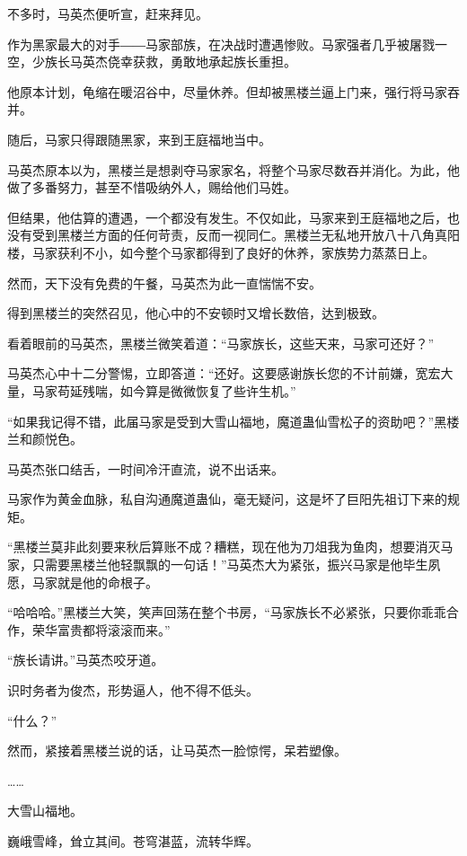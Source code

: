 
\begin{this_body}

不多时，马英杰便听宣，赶来拜见。

作为黑家最大的对手――马家部族，在决战时遭遇惨败。马家强者几乎被屠戮一空，少族长马英杰侥幸获救，勇敢地承起族长重担。

他原本计划，龟缩在暖沼谷中，尽量休养。但却被黑楼兰逼上门来，强行将马家吞并。

随后，马家只得跟随黑家，来到王庭福地当中。

马英杰原本以为，黑楼兰是想剥夺马家家名，将整个马家尽数吞并消化。为此，他做了多番努力，甚至不惜吸纳外人，赐给他们马姓。

但结果，他估算的遭遇，一个都没有发生。不仅如此，马家来到王庭福地之后，也没有受到黑楼兰方面的任何苛责，反而一视同仁。黑楼兰无私地开放八十八角真阳楼，马家获利不小，如今整个马家都得到了良好的休养，家族势力蒸蒸日上。

然而，天下没有免费的午餐，马英杰为此一直惴惴不安。

得到黑楼兰的突然召见，他心中的不安顿时又增长数倍，达到极致。

看着眼前的马英杰，黑楼兰微笑着道：“马家族长，这些天来，马家可还好？”

马英杰心中十二分警惕，立即答道：“还好。这要感谢族长您的不计前嫌，宽宏大量，马家苟延残喘，如今算是微微恢复了些许生机。”

“如果我记得不错，此届马家是受到大雪山福地，魔道蛊仙雪松子的资助吧？”黑楼兰和颜悦色。

马英杰张口结舌，一时间冷汗直流，说不出话来。

马家作为黄金血脉，私自沟通魔道蛊仙，毫无疑问，这是坏了巨阳先祖订下来的规矩。

“黑楼兰莫非此刻要来秋后算账不成？糟糕，现在他为刀俎我为鱼肉，想要消灭马家，只需要黑楼兰他轻飘飘的一句话！”马英杰大为紧张，振兴马家是他毕生夙愿，马家就是他的命根子。

“哈哈哈。”黑楼兰大笑，笑声回荡在整个书房，“马家族长不必紧张，只要你乖乖合作，荣华富贵都将滚滚而来。”

“族长请讲。”马英杰咬牙道。

识时务者为俊杰，形势逼人，他不得不低头。

“什么？”

然而，紧接着黑楼兰说的话，让马英杰一脸惊愕，呆若塑像。

……

大雪山福地。

巍峨雪峰，耸立其间。苍穹湛蓝，流转华辉。


\end{this_body}
